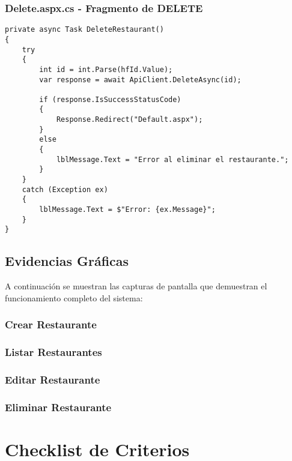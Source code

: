 \documentclass[12pt,a4paper]{report}
\begin{document}
\subsection{Delete.aspx.cs - Fragmento de DELETE}

\begin{lstlisting}[language={[Sharp]C}]
private async Task DeleteRestaurant()
{
    try
    {
        int id = int.Parse(hfId.Value);
        var response = await ApiClient.DeleteAsync(id);
        
        if (response.IsSuccessStatusCode)
        {
            Response.Redirect("Default.aspx");
        }
        else
        {
            lblMessage.Text = "Error al eliminar el restaurante.";
        }
    }
    catch (Exception ex)
    {
        lblMessage.Text = $"Error: {ex.Message}";
    }
}
\end{lstlisting}

\section{Evidencias Gráficas}

A continuación se muestran las capturas de pantalla que demuestran el funcionamiento completo del sistema:

\subsection{Crear Restaurante}

\subsection{Listar Restaurantes}

\subsection{Editar Restaurante}

\subsection{Eliminar Restaurante}

\chapter{Checklist de Criterios}
\end{document}
